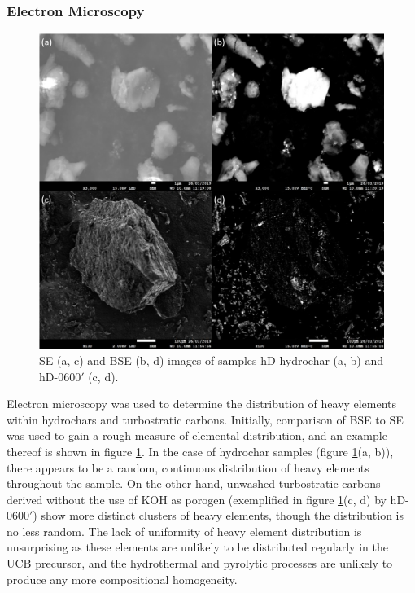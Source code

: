 \subsubsection{Electron Microscopy}

\begin{figure}[b!]
    \centering
    \includegraphics[width=\columnwidth, keepaspectratio]{4-cbs/figs/SEM_BSE.png}
    \caption{SE (a, c) and BSE (b, d) images of samples hD-hydrochar (a, b) and hD-0600$'$ (c, d).}
    \label{fig:SEM_BSE}
\end{figure}

Electron microscopy was used to determine the distribution of heavy elements within hydrochars and turbostratic carbons. Initially, comparison of BSE to SE was used to gain a rough measure of elemental distribution, and an example thereof is shown in figure \ref{fig:SEM_BSE}. In the case of hydrochar samples (figure \ref{fig:SEM_BSE}(a, b)), there appears to be a random, continuous distribution of heavy elements throughout the sample. On the other hand, unwashed turbostratic carbons derived without the use of KOH as porogen (exemplified in figure \ref{fig:SEM_BSE}(c, d) by hD-0600$'$) show more distinct clusters of heavy elements, though the distribution is no less random. The lack of uniformity of heavy element distribution is unsurprising as these elements are unlikely to be distributed regularly in the UCB precursor, and the hydrothermal and pyrolytic processes are unlikely to produce any more compositional homogeneity. 

